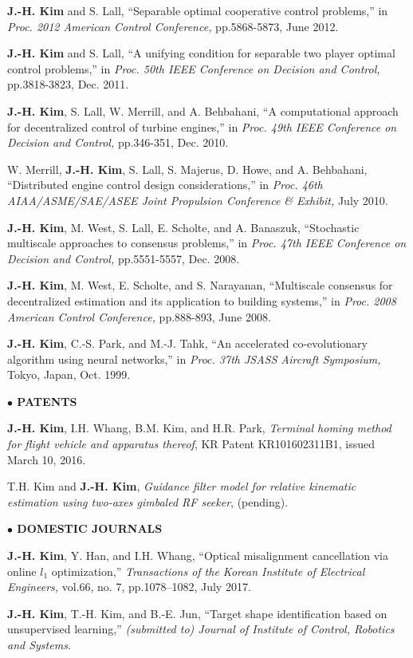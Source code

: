 \documentclass[margin,line]{res}
\begin{document}
\begin{resume}
{\bf J.-H. Kim} and S. Lall, ``Separable optimal cooperative control problems,'' in \emph{Proc. 2012 American Control Conference,} pp.5868-5873, June 2012.

{\bf J.-H. Kim} and S. Lall, ``A unifying condition for separable two player optimal control problems,'' in \emph{Proc. 50th IEEE Conference on Decision and Control,} pp.3818-3823, Dec. 2011.

{\bf J.-H. Kim}, S. Lall, W. Merrill, and A. Behbahani, ``A computational approach for decentralized control of turbine engines,'' in \emph{Proc. 49th IEEE Conference on Decision and Control,} pp.346-351, Dec. 2010.

W. Merrill, {\bf J.-H. Kim}, S. Lall, S. Majerus, D. Howe, and A. Behbahani, ``Distributed engine control design considerations,'' in \emph{Proc. 46th AIAA/ASME/SAE/ASEE Joint Propulsion Conference \& Exhibit,} July 2010.

{\bf J.-H. Kim}, M. West, S. Lall, E. Scholte, and A. Banaszuk, ``Stochastic multiscale approaches to consensus problems,'' in \emph{Proc. 47th IEEE Conference on Decision and Control,} pp.5551-5557, Dec. 2008.

{\bf J.-H. Kim}, M. West, E. Scholte, and S. Narayanan, ``Multiscale consensus for decentralized estimation and its application to building systems,'' in \emph{Proc. 2008 American Control Conference,} pp.888-893, June 2008.

{\bf J.-H. Kim}, C.-S. Park, and M.-J. Tahk, ``An accelerated co-evolutionary algorithm using neural networks,'' in \emph{Proc. 37th JSASS Aircraft Symposium,} Tokyo, Japan, Oct. 1999.

{\bf $\bullet$ PATENTS}

{\bf J.-H. Kim}, I.H. Whang, B.M. Kim, and H.R. Park, \emph{Terminal homing method for flight vehicle and apparatus thereof}, KR Patent KR101602311B1, issued March 10, 2016.

T.H. Kim and {\bf J.-H. Kim}, \emph{Guidance filter model for relative kinematic estimation using two-axes gimbaled RF seeker}, (pending).

{\bf $\bullet$ DOMESTIC JOURNALS}

{\bf J.-H. Kim}, Y. Han, and I.H. Whang, ``Optical misalignment cancellation via online $l_1$ optimization,'' \emph{Transactions of the Korean Institute of Electrical Engineers,} vol.66, no. 7, pp.1078--1082, July 2017.

{\bf J.-H. Kim}, T.-H. Kim, and B.-E. Jun, ``Target shape identification based on unsupervised learning,'' \emph{(submitted to) Journal of Institute of Control, Robotics and Systems.}


\end{resume}
\end{document}
